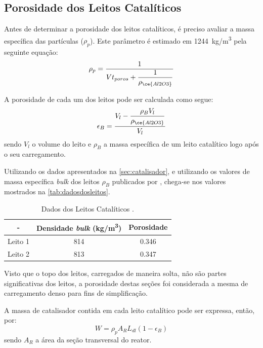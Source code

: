 \subsection{Porosidade dos Leitos Catalíticos}
\label{sec:propriedadesleitoscataliticos}

Antes de determinar a porosidade dos leitos catalíticos, é preciso avaliar a
massa específica das partículas ($\rho_{p}$). Este parâmetro é estimado em
\SI{1244}{kg/m^3} pela seguinte equação:
\begin{equation}
\rho_{p} = \dfrac{1}{Vt_{poros}+\dfrac{1}{\rho_{\ce{Al2O3}}}}
\label{eq:rhoparticula}
\end{equation}


A porosidade de cada um dos leitos pode ser calculada como segue:
\begin{equation}
\epsilon_{B} = \dfrac{V_{l}-\dfrac{\rho_{B}V_l}{\rho_{\ce{Al2O3}}}}{V_l}
\label{eq:porosidade}
\end{equation}
sendo $V_l$ o volume do leito e $\rho_B$ a massa específica de um leito
catalítico logo após o seu carregamento.

Utilizando os dados apresentados na \autoref{sec:catalisador}, e utilizando os
valores de massa específica \emph{bulk} dos leitos $\rho_{B}$ publicados por
, chega-se nos valores mostrados na
\autoref{tab:dadosdosleitos}.

\begin{table}[!htb]
\begin{center}
\caption{Dados dos Leitos Catalíticos \cite{Rojas2014a}.}
\label{tab:dadosdosleitos}
\small
\begin{tabular}{ccc}
{ - } & {Densidade \emph{bulk} (\si{kg/m^3})} & {Porosidade} 
\\
\hline
{Leito 1} & \num{814} & \num{0,346} \\
{Leito 2} & \num{813} & \num{0,347} \\
\bottomrule
\end{tabular}
\end{center}
\end{table}

Visto que o topo dos leitos, carregados de maneira solta, não são partes
significativas dos leitos, a porosidade destas seções foi
considerada a mesma de carregamento denso para fins de simplificação. 

A massa de catalisador contida em cada leito catalítico pode ser expressa,
então, por:
\begin{equation}
W = \rho_pA_RL_{dl}(1-\epsilon_{B})
\label{eq:massacatalisador}
\end{equation}
sendo $A_R$ a área da seção transversal do reator.

